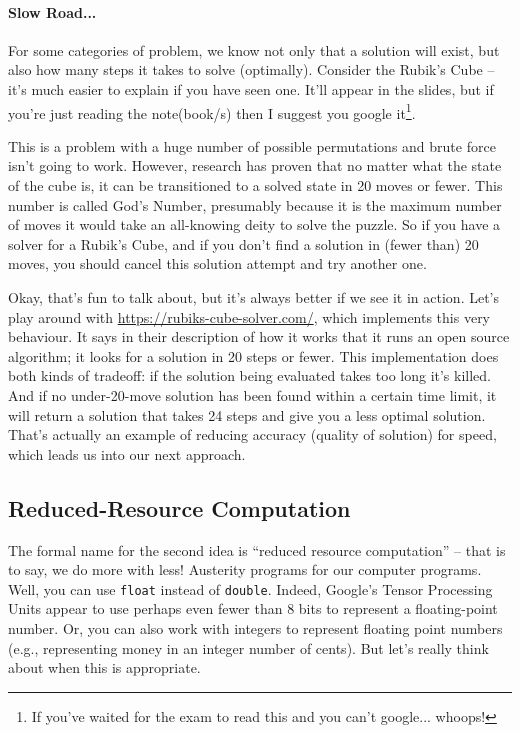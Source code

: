 \paragraph{Slow Road...}
For some categories of problem, we know not only that a solution will exist, but also how many steps it takes to solve (optimally). Consider the Rubik's Cube -- it's much easier to explain if you have seen one. It'll appear in the slides, but if you're just reading the note(book/s) then I suggest you google it\footnote{If you've waited for the exam to read this and you can't google... whoops!}.

This is a problem with a huge number of possible permutations and brute force isn't going to work. However, research has proven that no matter what the state of the cube is, it can be transitioned to a solved state in 20 moves or fewer. This number is called God's Number, presumably because it is the maximum number of moves it would take an all-knowing deity to solve the puzzle. So if you have a solver for a Rubik's Cube, and if you don't find a solution in (fewer than) 20 moves, you should cancel this solution attempt and try another one.

Okay, that's fun to talk about, but it's always better if we see it in action. Let's play around with \url{https://rubiks-cube-solver.com/}, which implements this very behaviour. It says in their description of how it works that it runs an open source algorithm; it looks for a solution in 20 steps or fewer. This implementation does both kinds of tradeoff: if the solution being evaluated takes too long it's killed. And if no under-20-move solution has been found within a certain time limit, it will return a solution that takes 24 steps and give you a less optimal solution. That's actually an example of reducing accuracy (quality of solution) for speed, which leads us into our next approach.

\subsection*{Reduced-Resource Computation}

The formal name for the second idea is ``reduced resource computation'' -- that is to say, we do more with less! Austerity programs for our computer programs. Well, you can use \texttt{float} instead of \texttt{double}. Indeed, Google's Tensor Processing Units appear to use perhaps even fewer than 8 bits to represent a floating-point number. Or, you can also work with integers to represent floating point numbers (e.g., representing money in an integer number of cents). But let's really think about when this is appropriate.

